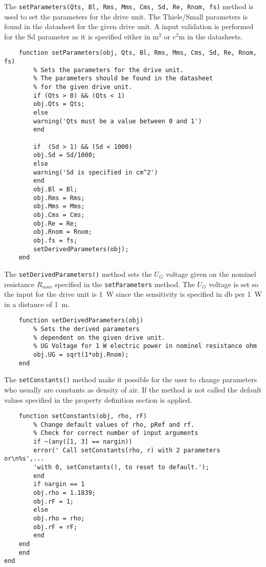 The \texttt{setParameters(Qts, Bl, Rms, Mms, Cms, Sd, Re, Rnom, fs)} 
\newline method is used to set the parameters for the drive unit.
The Thiele/Small parameters is found in the datasheet for the given drive unit. 
A input validation is performed for the Sd parameter as it is specified either in $\si{\square\meter}$ or $\si{\square\centi\meter}$ in the datasheets.
\begin{verbatim}
	function setParameters(obj, Qts, Bl, Rms, Mms, Cms, Sd, Re, Rnom, fs)
	    % Sets the parameters for the drive unit.
	    % The parameters should be found in the datasheet
	    % for the given drive unit. 
	    if (Qts > 0) && (Qts < 1)
		obj.Qts = Qts;
	    else 
		warning('Qts must be a value between 0 and 1')
	    end
	
	    if  (Sd > 1) && (Sd < 1000)
		obj.Sd = Sd/1000;
	    else
		warning('Sd is specified in cm^2')
	    end
	    obj.Bl = Bl;
	    obj.Rms = Rms;
	    obj.Mms = Mms;
	    obj.Cms = Cms;
	    obj.Re = Re;
	    obj.Rnom = Rnom;
	    obj.fs = fs;
	    setDerivedParameters(obj);
	end
\end{verbatim}

The \texttt{setDerivedParameters()} method sets the $U_G$ voltage given on the nominel resistance $R_{nom}$ specified in the \texttt{setParameters} method. 
The $U_G$ voltage is set so the input for the drive unit is \SI{1}{\watt} since the sensitivity is specified in \si{\decibel} per \SI{1}{\watt} in a distance of \SI{1}{\meter}.
\begin{verbatim}
	function setDerivedParameters(obj)
	    % Sets the derived parameters 
	    % dependent on the given drive unit.
	    % UG Voltage for 1 W electric power in nominel resistance ohm
	    obj.UG = sqrt(1*obj.Rnom);
	end
\end{verbatim}

The \texttt{setConstants()} method make it possible for the user to change parameters who usually are constants as density of air. 
If the method is not called the default values specified in the property definition section is applied.   
\begin{verbatim}
	function setConstants(obj, rho, rF)
	    % Change default values of rho, pRef and rf.	
	    % Check for correct number of input arguments
	    if ~(any([1, 3] == nargin))
		error(' Call setConstants(rho, r) with 2 parameters or\n%s',...
		'with 0, setConstants(), to reset to default.');
	    end
	    if nargin == 1
		obj.rho = 1.1839;
		obj.rF = 1;
	    else
		obj.rho = rho;
		obj.rF = rF;
	    end
	end
    end
end
\end{verbatim}